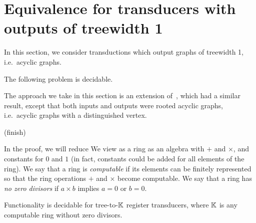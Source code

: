 
\section{Equivalence for transducers with outputs of treewidth 1}
In this section, we consider transductions which output graphs of treewidth 1, i.e.~acyclic graphs. 

\begin{theorem} The following problem is decidable.
\end{theorem}

The approach we take in this section is an extension of~\cite[Section 3.3]{boiretReducingTransducerEquivalence2018}, which had a similar result, except that both inputs and outputs were rooted acyclic graphs, i.e.~acyclic graphs with a distinguished vertex. 

\begin{center}
    (finish)
\end{center}

In the proof, we will reduce 
We view as a ring as an algebra with $+$ and $\times$, and constants for $0$ and $1$ (in fact, constants could be added for all elements of the ring). We say that a ring is \emph{computable} if its elements can be finitely represented so that the ring operations $+$ and $\times$ become computable. We say that a ring has  \emph{no zero divisors} if $a \times b$ implies $a = 0$ or $b=0$.


\begin{theorem}
    Functionality is decidable for tree-to-$\mathbb K$ register transducers, where $\mathbb K$ is any computable ring without zero divisors. 
\end{theorem}